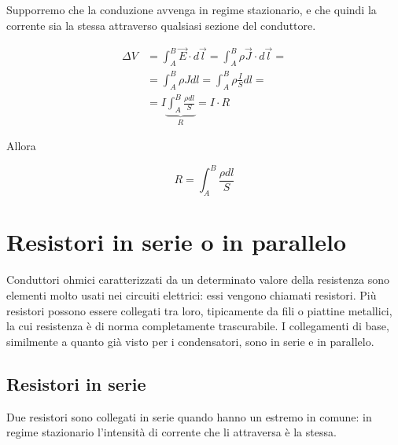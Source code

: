 Supporremo che la conduzione avvenga in regime stazionario, e che quindi la corrente sia la stessa attraverso qualsiasi sezione del conduttore.

\begin{align*}
	\Delta V &= \int_A^B \vec{E} \cdot d\vec{l} =\int_A^B \rho \vec{J} \cdot d\vec{l} =  \\
	&= \int_A^B \rho Jdl = \int_A^B \rho \frac{I}{S}dl= \\
	&= I \underbrace{\int_A^B \frac{\rho dl}{S}}_R = I \cdot R
\end{align*}

Allora

\[
	\boxed{R = \int_A^B \frac{\rho dl}{S}}
\]

\section{Resistori in serie o in parallelo}

Conduttori ohmici caratterizzati da un determinato valore della resistenza sono elementi molto usati nei circuiti elettrici: essi vengono chiamati resistori. Più resistori possono essere collegati tra loro, tipicamente da fili o piattine metallici, la cui resistenza è di norma completamente trascurabile. I collegamenti di base, similmente a quanto già visto per i condensatori, sono in serie e in parallelo.

\subsection{Resistori in serie}

Due resistori sono collegati in serie quando hanno un estremo in comune: in regime stazionario l'intensità di corrente che li attraversa è la stessa.

